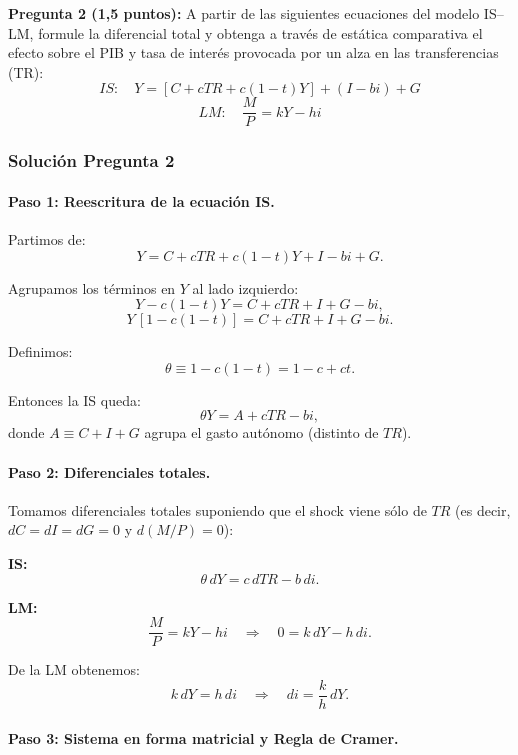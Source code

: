 \documentclass[11pt,addpoints]{article}
\begin{document}
\vspace{0.4cm}
\newpage
\vspace*{0.5cm}
\textbf{Pregunta 2 (1{,}5 puntos):}  
A partir de las siguientes ecuaciones del modelo IS--LM, formule la diferencial total y obtenga a través de estática comparativa el efecto sobre el PIB y tasa de interés provocada por un alza en las transferencias (TR):
\[
IS: \quad Y = [C + cTR + c(1 - t)Y] + (I - bi) + G
\]
\[
LM: \quad \frac{M}{P} = kY - hi
\]

\subsubsection*{Solución Pregunta 2}

\paragraph{Paso 1: Reescritura de la ecuación IS.}

Partimos de:
\[
Y = C + cTR + c(1-t)Y + I - bi + G.
\]

Agrupamos los términos en $Y$ al lado izquierdo:
\[
Y - c(1-t)Y = C + cTR + I + G - bi,
\]
\[
Y\,[1 - c(1-t)] = C + cTR + I + G - bi.
\]

Definimos:
\[
\theta \equiv 1 - c(1-t) = 1 - c + ct.
\]

Entonces la IS queda:
\[
\theta Y = A + cTR - bi,
\]
donde $A \equiv C + I + G$ agrupa el gasto autónomo (distinto de $TR$).

\medskip

\paragraph{Paso 2: Diferenciales totales.}

Tomamos diferenciales totales suponiendo que el shock viene sólo de $TR$ (es decir, $dC = dI = dG = 0$ y $d(M/P)=0$):

\textbf{IS:}
\[
\theta\, dY = c\, dTR - b\, di.
\]

\textbf{LM:}
\[
\frac{M}{P} = kY - hi \quad \Rightarrow \quad 0 = k\,dY - h\,di.
\]

De la LM obtenemos:
\[
k\,dY = h\,di \quad \Rightarrow \quad di = \frac{k}{h}\, dY.
\]

\medskip

\paragraph{Paso 3: Sistema en forma matricial y Regla de Cramer.}
\end{document}
